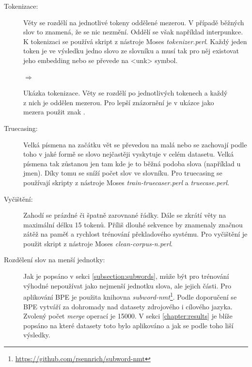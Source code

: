 \begin{description}
  \item[Tokenizace:] Věty se rozdělí na jednotlivé tokeny oddělené mezerou. V případě běžných slov to znamená, že se nic nezmění. Oddělí se však například interpunkce. K tokenizaci se používá skript z nástroje Moses \emph{tokenizer.perl}. Každý jeden token je ve výsledku jedno slovo ze slovníku a musí tak pro něj existovat jeho embedding nebo se převede na <unk> symbol.
\end{description}

\begin{figure}[H]
    \begin{center}
     \setlength{\fboxsep}{8pt}
        $\Longrightarrow$
        \setlength{\fboxsep}{8pt}
    \end{center}
	\caption{Ukázka tokenizace. Věty se rozdělí po jednotlivých tokenech a každý z nich je oddělen mezerou. Pro lepší znázornění je v ukázce jako mezera použit znak \uv{\textvisiblespace}.}
	\label{img:tokenization}
\end{figure}


\begin{description}
  \item[Truecasing:] Velká písmena na začátku vět se převedou na malá nebo se zachovají podle toho v jaké formě se slovo nejčastěji vyskytuje v celém datasetu. Velká písmena tak zůstanou jen tam kde je to běžná podoba slova (například u jmen). Díky tomu se sníží počet slov ve slovníku. Pro truecasing se používají skripty z nástroje Moses \emph{train-truecaser.perl} a \emph{truecase.perl}.
\end{description}

\begin{description}
  \item[Vyčištění:] Zahodí se prázdné či špatně zarovnané řádky. Dále se zkrátí věty na maximální délku 15 tokenů. Příliš dlouhé sekvence by znamenaly značnou zátěž na paměť a rychlost trénování překladového systému. Pro vyčištění je použit skript z nástroje Moses \emph{clean-corpus-n.perl}.
\end{description}

\begin{description}
  \item[Rozdělení slov na menší jednotky:]\label{description:bpeApplication} Jak je popsáno v sekci \ref{subsection:subwords}, může být pro trénování výhodné nepoužívat jako nejmenší jednotku slova, ale jejich části. Pro aplikování BPE je použita knihovna \emph{subword-nmt}\footnote{\url{https://github.com/rsennrich/subword-nmt}}. Podle doporučení se BPE vytváří za dohromady nad datasety zdrojového i cílového jazyka. Zvolený počet \emph{merge} operací je 15000. V sekci \ref{chapter:results} je blíže popsáno na které datasety toto bylo aplikováno a jak se podle toho liší výsledky.
\end{description}


